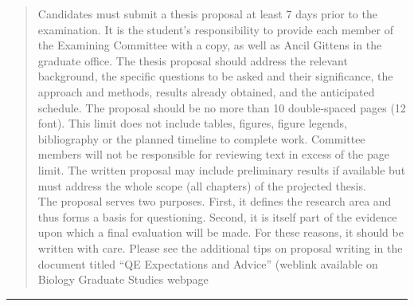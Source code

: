 \documentclass[10pt,oneside]{article}
\begin{document}
\begin{quote}
Candidates must submit a thesis proposal at least 7 days prior to the
examination. It is the student's responsibility to provide each member
of the Examining Committee with a copy, as well as Ancil Gittens in the
graduate office. The thesis proposal should address the relevant
background, the specific questions to be asked and their significance,
the approach and methods, results already obtained, and the anticipated
schedule. The proposal should be no more than 10 double-spaced pages (12
font). This limit does not include tables, figures, figure legends,
bibliography or the planned timeline to complete work. Committee members
will not be responsible for reviewing text in excess of the page limit.
The written proposal may include preliminary results if available but
must address the whole scope (all chapters) of the projected thesis.\\
The proposal serves two purposes. First, it defines the research area
and thus forms a basis for questioning. Second, it is itself part of the
evidence upon which a final evaluation will be made. For these reasons,
it should be written with care. Please see the additional tips on
proposal writing in the document titled ``QE Expectations and Advice''
(weblink available on Biology Graduate Studies webpage
\end{quote}

\begin{center}\rule{0.5\linewidth}{0.5pt}\end{center}
\end{document}
